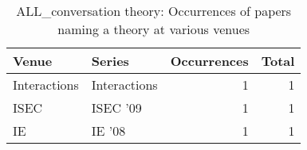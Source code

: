 \begin{table*}[t]
\begin{tabular}{llrr}
Venue & Series & Occurrences & Total\\\hline
\multirow{1}{*}{Interactions} & Interactions & 1 & \multirow{1}{*}{1}\\
\multirow{1}{*}{ISEC } & ISEC '09 & 1 & \multirow{1}{*}{1}\\
\multirow{1}{*}{IE } & IE '08 & 1 & \multirow{1}{*}{1}\\
\end{tabular}
\caption{ALL\_conversation theory: Occurrences of papers naming a theory at various venues}
\end{table*}